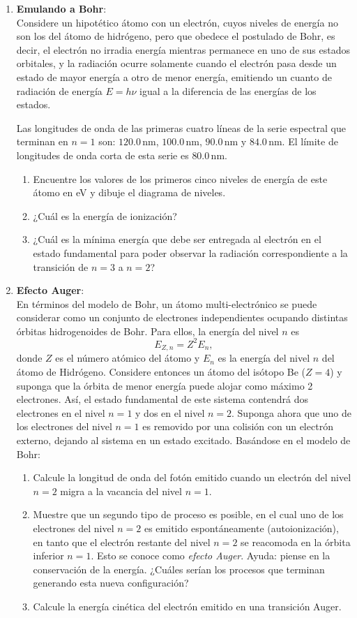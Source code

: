 \documentclass[a4paper,12pt]{article}
\begin{document}
\begin{enumerate}
\item {\bf{Emulando a Bohr}}:\\
	Considere un hipotético átomo con un electrón, cuyos niveles de energía no
		son los del átomo de hidrógeno, pero que obedece el postulado de Bohr,
		es decir, el electrón no irradia energía mientras permanece en uno de
		sus estados orbitales, y la radiación ocurre solamente cuando el
		electrón pasa desde un estado de mayor energía a otro de menor energía,
		emitiendo un cuanto de radiación de energía $E=h\nu$ igual a la
		diferencia de las energías de los estados. 
		
	Las longitudes de onda de las primeras cuatro líneas de la serie
		espectral que terminan en $n = 1$ son: $120.0$\,nm, $100.0$\,nm,
		$90.0$\,nm y $84.0$\,nm. El límite de longitudes de onda corta de esta
		serie es $80.0$\,nm. 
	\begin{enumerate} \item Encuentre los valores de los primeros cinco niveles
			de energía de este átomo en eV y dibuje el diagrama de niveles.
		\item ¿Cuál es la energía de ionización?  \item ¿Cuál es la mínima
			energía que debe ser entregada al electrón en el estado fundamental
	para poder observar la radiación correspondiente a la transición de $n = 3$
	a $n = 2$?  \end{enumerate}

\item {\bf{Efecto Auger}}:\\ En términos del modelo de Bohr, un átomo
	multi-electrónico se puede considerar como un conjunto de electrones
	independientes ocupando distintas órbitas hidrogenoides de Bohr. Para
	ellos, la energía del nivel $n$ es $$E_{Z,n} = Z^2 E_n,$$ donde $Z$ es el
	número atómico del átomo y $E_n$ es la energía del nivel $n$ del átomo de
	Hidrógeno. Considere entonces un átomo del isótopo Be ($Z=4$) y suponga que
	la órbita de menor energía puede alojar como máximo 2 electrones. Así, el
	estado fundamental de este sistema contendrá dos electrones en el nivel $n
	= 1$ y dos en el nivel $n = 2$. Suponga ahora que uno de los electrones del
	nivel $n = 1$ es removido por una colisión con un electrón externo, dejando
	al sistema en un estado excitado. Basándose en el modelo de Bohr:
	
	\begin{enumerate}
		\item Calcule la longitud de onda del fotón emitido cuando un electrón
			del nivel $n = 2$ migra a la vacancia del nivel $n = 1$.
		\item Muestre que un segundo tipo de proceso es posible, en el cual uno
			de los electrones del nivel $n=2$ es emitido espontáneamente
			(autoionización), en tanto que el electrón restante del nivel $n=2$
			se reacomoda en la órbita inferior $n=1$. Esto se conoce como
			{\emph{efecto Auger}}. Ayuda: piense en la conservación de la
			energía. ¿Cuáles serían los procesos que terminan generando esta
			nueva configuración?
		\item Calcule la energía cinética del electrón emitido en una
			transición Auger.  
	\end{enumerate}


\end{enumerate}
\end{document}
